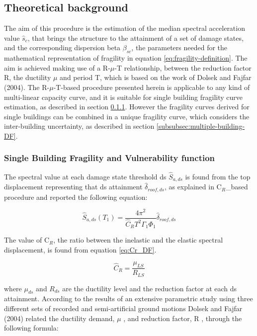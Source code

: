\subsection{Theoretical background}
The aim of this procedure is the estimation of the median spectral acceleration value $\hat{s}_c$, that brings the structure to the attainment of a set of damage states, and the corresponding dispersion beta $\beta_{sc}$, the parameters needed for the mathematical representation of fragility in equation \ref{eq:fragility-definition}. The aim is achieved making use of a R-$\mu$-T relationship, between the reduction factor R, the ductility $\mu$ and period T, which is based on the work of Dolsek and Fajfar (2004). The R-$\mu$-T-based procedure presented herein is applicable to any kind of multi-linear capacity curve, and it is suitable for single building fragility curve estimation, as described in section \ref{subsubsec:single-building-DF}. However the fragility curves derived for single buildings can be combined in a unique fragility curve, which considers the inter-building uncertainty, as described in section \ref{subsubsec:multiple-building-DF}.

\subsubsection{Single Building Fragility and Vulnerability function}
\label{subsubsec:single-building-DF}
The spectral value at each damage state threshold ds $\hat{S}_{a,ds}$ is found from the top displacement representing that ds attainment $\hat{\delta}_{roof, ds}$, as explained in C$_{R}$\_based procedure and reported the following equation:

\begin{equation}
\hat{S}_{a,ds}(T_1) = \frac{4 \pi^2}{\hat{C}_R T^2 \Gamma_1 \Phi_1} \hat{\delta}_{roof, ds}
\label{eq:basic_DF}
\end{equation}

The value of C$_R$, the ratio between the inelastic and the elastic spectral displacement, is found from equation \ref{eq:Cr_DF}.

\begin{equation}
\hat{C}_{R} = \frac{\mu_{LS}}{R_{LS}}
\label{eq:Cr_DF}
\end{equation}

where $\mu_{ds}$ and $R_{ds}$ are the ductility level and the reduction factor at each ds attainment. According to the results of an extensive parametric study using three different sets of recorded and semi-artificial ground motions Dolsek and Fajfar (2004) related the ductility demand, $\mu$ , and reduction factor, R , through the following formula:

